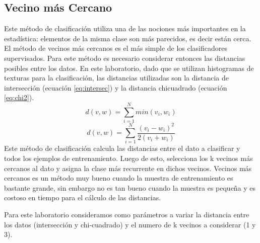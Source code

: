 \documentclass[10pt,twocolumn,letterpaper]{article}
\begin{document}
\subsection{Vecino más Cercano}
Este método de clasificación utiliza una de las nociones más importantes en la estadística: elementos de la misma clase son más parecidos, es decir están cerca. El método de vecinos más cercanos es el más simple de los clasificadores supervisados. Para este método es necesario considerar entonces las distancias posibles entre los datos. En este laboratorio, dado que se utilizan histogramas de texturas para la clasificación, las distancias utilizadas son la distancia de intersección (ecuación \ref{eq:intersec}) y la distancia chi\-cuadrado (ecuación \ref{eq:chi2}).
\begin{equation} \label{eq:intersec}
d(v,w)= \sum _{i=1}^{N} min(v_i,w_i)
\end{equation}
\begin{equation} \label{eq:chi2}
d(v,w)= \sum _{i=1}^{N} \frac{(v_i-w_i)^2}{2(v_i+w_i)}
\end{equation}
Este método de clasificación calcula las distancias entre el dato a clasificar y todos los ejemplos de entrenamiento. Luego de esto, selecciona los k vecinos más cercanos al dato y asigna la clase más recurrente en dichos vecinos. Vecinos más cercanos es un método muy bueno cuando la muestra de entrenamiento es bastante grande, sin embargo no es tan bueno cuando la muestra es pequeña y es costoso en tiempo para el cálculo de las distancias.

Para este laboratorio consideramos como parámetros a variar la distancia entre los datos (intersección y chi-cuadrado) y el numero de k vecinos a considerar (1 y 3). 
\end{document}
